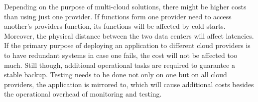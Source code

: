\documentclass[11pt]{article}
\begin{document}
Depending on the purpose of multi-cloud solutions, there might be higher costs than using just one provider. If functions form one provider need to access another's providers function, its functions will be affected by cold starts. Moreover, the physical distance between the two data centers will affect latencies. If the primary purpose of deploying an application to different cloud providers is to have redundant systems in case one fails, the cost will not be affected too much. Still though, additional operational tasks are required to guarantee a stable backup. Testing needs to be done not only on one but on all cloud providers, the application is mirrored to, which will cause additional costs besides the operational overhead of monitoring and testing. \\\\

\end{document}
